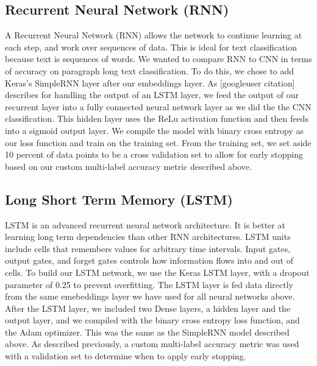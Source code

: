 \documentclass[sigconf]{acmart}
\begin{document}
\subsection{Recurrent Neural Network (RNN)}
A Recurrent Neural Network (RNN) allows the network to continue learning at each step, and work over sequences of data. This is ideal for text classification because text is sequences of words. We wanted to compare RNN to CNN in terms of accuracy on paragraph long text classification.  To do this, we chose to add Keras's SimpleRNN layer after our embeddings layer. As [googleuser citation] describes for handling the output of an LSTM layer, we feed the output of our recurrent layer into a fully connected neural network layer as we did the the CNN classification. This hidden layer uses the ReLu activation function and then feeds into a sigmoid output layer. We compile the model with binary cross entropy as our loss function and train on the training set.  From the training set, we set aside 10 percent of data points to be a cross validation set to allow for early stopping based on our custom multi-label accuracy metric described above. 

\subsection{Long Short Term Memory (LSTM)}
LSTM is an advanced recurrent neural network architecture.  It is better at learning long term dependencies than other RNN architectures.  LSTM units include cells that remembers values for arbitrary time intervals. Input gates, output gates, and forget gates controls how information flows into and out of cells. To build our LSTM network, we use the Keras LSTM layer, with a dropout parameter of 0.25 to prevent overfitting. The LSTM layer is fed data directly from the same emebeddings layer we have used for all neural networks above. After the LSTM layer, we included two Dense layers, a hidden layer and the output layer, and we compiled with the binary cross entropy loss function, and the Adam optimizer. This was the same as the SimpleRNN model described above. As described previously, a custom multi-label accuracy metric was used with a validation set to determine when to apply early stopping. 
\end{document}
